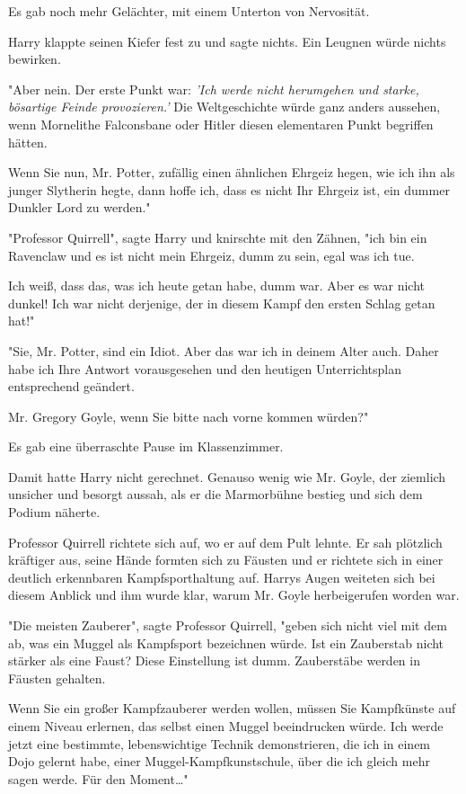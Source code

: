 {Es gab noch mehr Gelächter, mit einem Unterton von Nervosität.

Harry klappte seinen Kiefer fest zu und sagte nichts. Ein Leugnen würde nichts bewirken.

"Aber nein. Der erste Punkt war: \emph{'Ich werde nicht herumgehen und starke, bösartige Feinde provozieren.'} Die Weltgeschichte würde ganz anders aussehen, wenn Mornelithe Falconsbane oder Hitler diesen elementaren Punkt begriffen hätten.

Wenn Sie nun, Mr. Potter, zufällig einen ähnlichen Ehrgeiz hegen, wie ich ihn als junger Slytherin hegte, dann hoffe ich, dass es nicht Ihr Ehrgeiz ist, ein dummer Dunkler Lord zu werden."

"Professor Quirrell", sagte Harry und knirschte mit den Zähnen, "ich bin ein Ravenclaw und es ist nicht mein Ehrgeiz, dumm zu sein, egal was ich tue.

Ich weiß, dass das, was ich heute getan habe, dumm war. Aber es war nicht dunkel! Ich war nicht derjenige, der in diesem Kampf den ersten Schlag getan hat!"

"Sie, Mr. Potter, sind ein Idiot. Aber das war ich in deinem Alter auch. Daher habe ich Ihre Antwort vorausgesehen und den heutigen Unterrichtsplan entsprechend geändert.

Mr. Gregory Goyle, wenn Sie bitte nach vorne kommen würden?"

Es gab eine überraschte Pause im Klassenzimmer.

Damit hatte Harry nicht gerechnet. Genauso wenig wie Mr. Goyle, der ziemlich unsicher und besorgt aussah, als er die Marmorbühne bestieg und sich dem Podium näherte.

Professor Quirrell richtete sich auf, wo er auf dem Pult lehnte. Er sah plötzlich kräftiger aus, seine Hände formten sich zu Fäusten und er richtete sich in einer deutlich erkennbaren Kampfsporthaltung auf. Harrys Augen weiteten sich bei diesem Anblick und ihm wurde klar, warum Mr. Goyle herbeigerufen worden war.

"Die meisten Zauberer", sagte Professor Quirrell, "geben sich nicht viel mit dem ab, was ein Muggel als Kampfsport bezeichnen würde. Ist ein Zauberstab nicht stärker als eine Faust? Diese Einstellung ist dumm. Zauberstäbe werden in Fäusten gehalten.

Wenn Sie ein großer Kampfzauberer werden wollen, müssen Sie Kampfkünste auf einem Niveau erlernen, das selbst einen Muggel beeindrucken würde. Ich werde jetzt eine bestimmte, lebenswichtige Technik demonstrieren, die ich in einem Dojo gelernt habe, einer Muggel-Kampfkunstschule, über die ich gleich mehr sagen werde. Für den Moment…"

}
